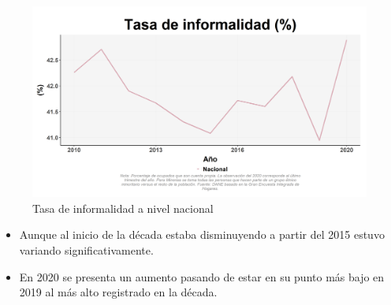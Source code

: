     \begin{figure}[H]
        \caption{Tasa de informalidad a nivel nacional \label{map_result_2} }
        \begin{center}
        \includegraphics[width=\textwidth,keepaspectratio]{img/var_70_trend.png}
        \end{center}
    \end{figure}
            \begin{itemize}
                \item Aunque al inicio de la década estaba disminuyendo a partir del 2015 estuvo variando significativamente.
                \item En 2020 se presenta un aumento pasando de estar en su punto más bajo en 2019 al más alto registrado en la década.
                \end{itemize}

